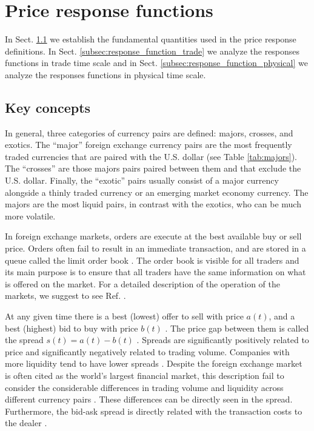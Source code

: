 \section{Price response functions}
\label{sec:response_functions}
In Sect. \ref{subsec:key_concepts} we establish the fundamental quantities used
in the price response definitions.
In Sect. \ref{subsec:response_function_trade} we analyze the responses
functions in trade time scale and in Sect. \ref{subsec:response_function_physical}
we analyze the responses functions in physical time scale.

\subsection{Key concepts}\label{subsec:key_concepts}

In general, three categories of currency pairs are defined: majors, crosses,
and exotics. The ``major'' foreign exchange currency pairs are the most
frequently traded currencies that are paired with the U.S. dollar (see Table
\ref{tab:majors}). The ``crosses'' are those majors pairs paired between them
and that exclude the U.S. dollar. Finally, the ``exotic'' pairs usually consist
of a major currency alongside a thinly traded currency or an emerging market
economy currency. The majors are the most liquid pairs, in contrast with the
exotics, who can be much more volatile.

In foreign exchange markets, orders are execute at the best available buy or
sell price. Orders often fail to result in an immediate transaction, and are
stored in a queue called the limit order book
\cite{forex_market_micro,forex_structure,stat_prop,predictive_pow,intro_market_micro,prop_order_book}.
The order book is visible for all traders and its main purpose is to ensure
that all traders have the same information on what is offered on the market.
For a detailed description of the operation of the markets, we suggest to see
Ref. \cite{my_paper_response_financial}.

At any given time there is a best (lowest) offer to sell with price
$a\left(t\right)$, and a best (highest) bid to buy with price $b\left(t\right)$
\cite{subtle_nature,prop_order_book,account_spread,limit_ord_spread,stat_theory}.
The price gap between them is called the spread
$s\left(t\right) = a\left(t\right)-b\left(t\right)$
\cite{teach_spread,subtle_nature,Bouchaud_2004,large_prices_changes,market_digest,account_spread,stat_theory,em_stylized_facts}.
Spreads are significantly positively related to price and significantly
negatively related to trading volume. Companies with more liquidity tend to
have lower spreads
\cite{components_spread_tokyo,account_spread,effects_spread,components_spread}.
Despite the foreign exchange market is often cited as the world's largest
financial market, this description fail to consider the considerable differences
in trading volume and liquidity across different currency pairs
\cite{forex_microstructure}. These differences can be directly seen in the
spread. Furthermore, the bid-ask spread is directly related with the
transaction costs to the dealer \cite{teach_spread,spread_futures}.

